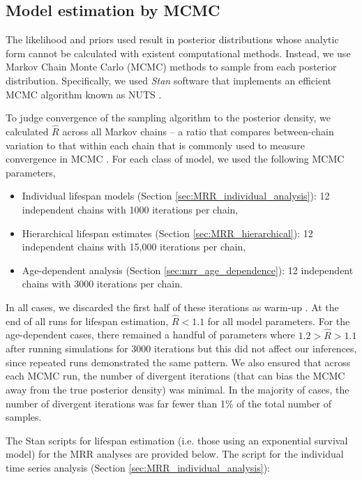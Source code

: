 \documentclass[12pt]{article}
\begin{document}
\subsection{Model estimation by MCMC}\label{sec:mrr_MCMC}
The likelihood and priors used result in posterior distributions whose analytic form cannot be calculated with existent computational methods. Instead, we use Markov Chain Monte Carlo (MCMC) methods to sample from each posterior distribution. Specifically, we used \textit{Stan} software \citep{carpenter2016stan} that implements an efficient MCMC algorithm known as NUTS \citep{hoffman2014no}.

To judge convergence of the sampling algorithm to the posterior density, we calculated $\hat{R}$ across all Markov chains -- a ratio that compares between-chain variation to that within each chain that is commonly used to measure convergence in MCMC \citep{gelman1992inference}. For each class of model, we used the following MCMC parameters,
%
\begin{itemize}
	\item Individual lifespan models (Section \ref{sec:MRR_individual_analysis}): 12 independent chains with 1000 iterations per chain,
	\item Hierarchical lifespan estimates (Section \ref{sec:MRR_hierarchical}): 12 independent chains with 15,000 iterations per chain,
	\item Age-dependent analysis (Section \ref{sec:mrr_age_dependence}): 12 independent chains with 3000 iterations per chain.
\end{itemize}

In all cases, we discarded the first half of these iterations as warm-up \citep{gelman2014bayesian}. At the end of all runs for lifespan estimation, $\hat{R}<1.1$ for all model parameters. For the age-dependent cases, there remained a handful of parameters where $1.2>\hat{R}>1.1$ after running simulations for 3000 iterations but this did not affect our inferences, since repeated runs demonstrated the same pattern. We also ensured that across each MCMC run, the number of divergent iterations (that can bias the MCMC away from the true posterior density) was minimal. In the majority of cases, the number of divergent iterations was far fewer than 1\% of the total number of samples.

The Stan scripts for lifespan estimation (i.e. those using an exponential survival model) for the MRR analyses are provided below. The script for the individual time series analysis (Section \ref{sec:MRR_individual_analysis}):
\end{document}
